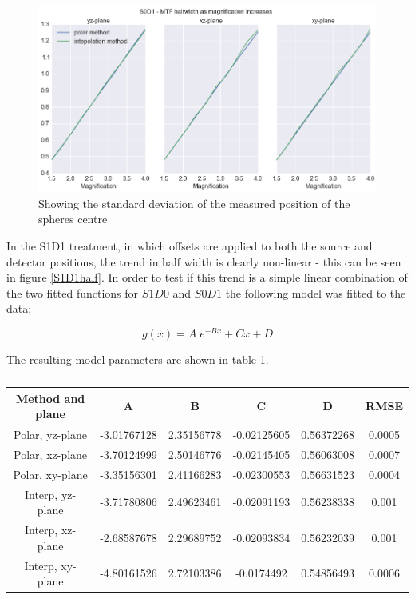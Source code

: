 \documentclass[
  twoside,
  11pt, a4paper,
  footinclude=true,
  headinclude=true,
  cleardoublepage=empty
]{scrbook}
\begin{document}
\begin{figure}[h!]
  \centering
    \includegraphics[width=\textwidth]{figures/S0D1half.png}
    \caption{Showing the standard deviation of the measured position of the spheres centre}
        \label{S0D1half}
\end{figure}

In the S1D1 treatment, in which offsets are applied to both the source and detector positions, the trend in half width is clearly non-linear - this can be seen in figure \ref{S1D1half}. In order to test if this trend is a simple linear combination of the two fitted functions for $S1D0$ and $S0D1$ the following model was fitted to the data;

\[
g(x) = A \; e^{-Bx} + Cx + D
\]

The resulting model parameters are shown in table \ref{explinhalffit}.

\begin{table}
\caption{}
\label{explinhalffit}
\begin{tabular}{c|ccccc}
\toprule
{} Method and plane &     A &     B  & C & D&  RMSE\\
\midrule
Polar, yz-plane     &    -3.01767128 & 2.35156778 & -0.02125605 & 0.56372268 & 0.0005\\
Polar, xz-plane     &   -3.70124999 & 2.50146776 & -0.02145405 & 0.56063008 & 0.0007\\
Polar, xy-plane     & -3.35156301 & 2.41166283 & -0.02300553 & 0.56631523 & 0.0004\\
Interp, yz-plane     & -3.71780806 & 2.49623461 & -0.02091193 & 0.56238338 & 0.001\\
Interp, xz-plane     &  -2.68587678 & 2.29689752 & -0.02093834 & 0.56232039 & 0.001\\
Interp, xy-plane     &  -4.80161526 & 2.72103386 & -0.0174492  & 0.54856493 & 0.0006\\
\bottomrule
\end{tabular}
\end{table}
\end{document}
